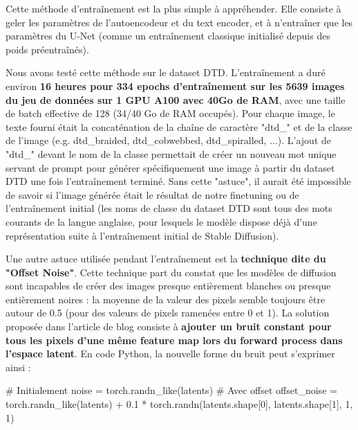 \documentclass{article}
\begin{document}
Cette méthode d'entraînement est la plus simple à appréhender. Elle consiste à geler les paramètres de l'autoencodeur et du text encoder, et à n'entraîner que les paramètres du U-Net (comme un entraînement classique initialisé depuis des poids préentraînés). \par
Nous avons testé cette méthode sur le dataset DTD. L'entraînement a duré environ \textbf{16 heures pour 334 epochs d'entraînement sur les 5639 images du jeu de données sur 1 GPU A100 avec 40Go de RAM}, avec une taille de batch effective de 128 (34/40 Go de RAM occupés). Pour chaque image, le texte fourni était la concaténation de la chaîne de caractère "dtd\_" et de la classe de l'image (e.g. dtd\_braided, dtd\_cobwebbed, dtd\_spiralled, ...). L'ajout de "dtd\_" devant le nom de la classe permettait de créer un nouveau mot unique servant de prompt pour générer spécifiquement une image à partir du dataset DTD une fois l'entraînement terminé. Sans cette "astuce", il aurait été impossible de savoir si l'image générée était le résultat de notre finetuning ou de l'entraînement initial (les noms de classe du dataset DTD sont tous des mots courants de la langue anglaise, pour lesquels le modèle dispose déjà d'une représentation suite à l'entraînement initial de Stable Diffusion). \par
Une autre astuce utilisée pendant l'entraînement est la \textbf{technique dite du "Offset Noise"}. Cette technique part du constat que les modèles de diffusion sont incapables de créer des images presque entièrement blanches ou presque entièrement noires : la moyenne de la valeur des pixels semble toujours être autour de 0.5 (pour des valeurs de pixels ramenées entre 0 et 1). La solution proposée dans l'article de blog \cite{offset_noise} consiste à \textbf{ajouter un bruit constant pour tous les pixels d'une même feature map lors du forward process dans l'espace latent}. En code Python, la nouvelle forme du bruit peut s'exprimer ainsi :
\begin{python}
# Initialement
noise = torch.randn_like(latents)
# Avec offset
offset_noise = torch.randn_like(latents) +
               0.1 * torch.randn(latents.shape[0], latents.shape[1], 1, 1)
\end{python}
\end{document}
